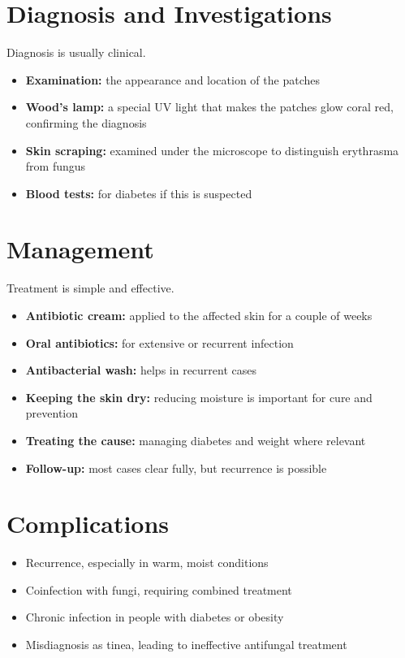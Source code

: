 \section*{Diagnosis and Investigations}
Diagnosis is usually clinical.
\begin{itemize}
    \item \textbf{Examination:} the appearance and location of the patches
    \item \textbf{Wood's lamp:} a special UV light that makes the patches glow coral red, confirming the diagnosis
    \item \textbf{Skin scraping:} examined under the microscope to distinguish erythrasma from fungus
    \item \textbf{Blood tests:} for diabetes if this is suspected
\end{itemize}

\section*{Management}
Treatment is simple and effective.
\begin{itemize}
    \item \textbf{Antibiotic cream:} applied to the affected skin for a couple of weeks
    \item \textbf{Oral antibiotics:} for extensive or recurrent infection
    \item \textbf{Antibacterial wash:} helps in recurrent cases
    \item \textbf{Keeping the skin dry:} reducing moisture is important for cure and prevention
    \item \textbf{Treating the cause:} managing diabetes and weight where relevant
    \item \textbf{Follow-up:} most cases clear fully, but recurrence is possible
\end{itemize}

\section*{Complications}
\begin{itemize}
    \item Recurrence, especially in warm, moist conditions
    \item Coinfection with fungi, requiring combined treatment
    \item Chronic infection in people with diabetes or obesity
    \item Misdiagnosis as tinea, leading to ineffective antifungal treatment
\end{itemize}

